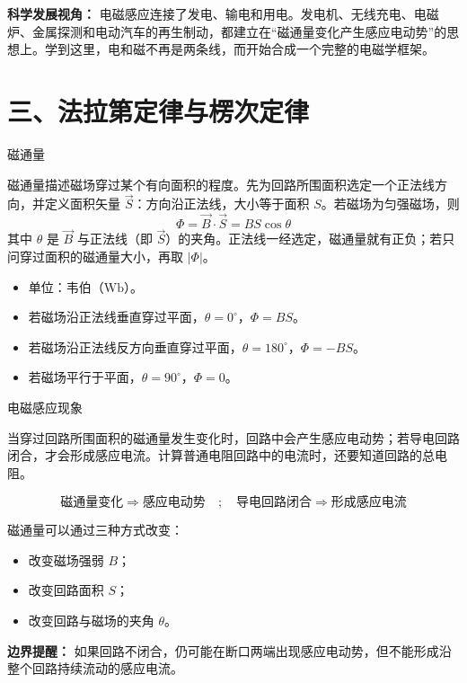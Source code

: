 \textbf{科学发展视角：} 电磁感应连接了发电、输电和用电。发电机、无线充电、电磁炉、金属探测和电动汽车的再生制动，都建立在“磁通量变化产生感应电动势”的思想上。学到这里，电和磁不再是两条线，而开始合成一个完整的电磁学框架。

\section*{三、法拉第定律与楞次定律}

\begin{conceptbox}{磁通量}

磁通量描述磁场穿过某个有向面积的程度。先为回路所围面积选定一个正法线方向，并定义面积矢量 $\vec S$：方向沿正法线，大小等于面积 $S$。若磁场为匀强磁场，则
\[
\boxed{\Phi=\vec B\cdot\vec S=BS\cos\theta}
\]
其中 $\theta$ 是 $\vec B$ 与正法线（即 $\vec S$）的夹角。正法线一经选定，磁通量就有正负；若只问穿过面积的磁通量大小，再取 $|\Phi|$。

\begin{itemize}
  \item 单位：韦伯（$\mathrm{Wb}$）。
  \item 若磁场沿正法线垂直穿过平面，$\theta=0^\circ$，$\Phi=BS$。
  \item 若磁场沿正法线反方向垂直穿过平面，$\theta=180^\circ$，$\Phi=-BS$。
  \item 若磁场平行于平面，$\theta=90^\circ$，$\Phi=0$。
\end{itemize}

\begin{center}


\label{fig:magnetic-flux-angle}
\end{center}

\end{conceptbox}

\begin{conceptbox}{电磁感应现象}

当穿过回路所围面积的磁通量发生变化时，回路中会产生感应电动势；若导电回路闭合，才会形成感应电流。计算普通电阻回路中的电流时，还要知道回路的总电阻。

\[
\boxed{\text{磁通量变化}\Rightarrow\text{感应电动势}\quad;\quad
  \text{导电回路闭合}\Rightarrow\text{形成感应电流}}
\]

磁通量可以通过三种方式改变：
\begin{itemize}
  \item 改变磁场强弱 $B$；
  \item 改变回路面积 $S$；
  \item 改变回路与磁场的夹角 $\theta$。
\end{itemize}

\begin{center}


\label{fig:induction-three-ways}
\end{center}

\textbf{边界提醒：} 如果回路不闭合，仍可能在断口两端出现感应电动势，但不能形成沿整个回路持续流动的感应电流。

\end{conceptbox}

